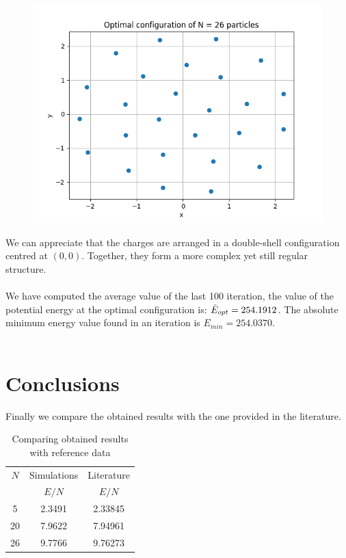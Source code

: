 \documentclass{article}
\begin{document}
\begin{figure}[H]
    \centering
    \includegraphics[width=\linewidth]{images/Figure2.N26.png}
    \caption{}
    \label{fig:Figure2.N26.png}
\end{figure}
\noindent We can  appreciate that the charges are arranged in a double-shell configuration centred at $(0,0)$. Together, they form a more complex yet still regular structure.\\\\We have computed the average value of the last 100 iteration, the value of the potential energy at the optimal configuration is: $\Tilde{E}_{opt}=254.1912$. The absolute minimum energy value found in an iteration is $E_{min}=254.0370$.\\\\
\section{Conclusions}
Finally we compare the obtained results with the one provided in the literature.
\begin{table}[H]
    \centering
    \begin{tabular}{|c|c|c|}
        \hline
        $N$& Simulations & Literature \\
        &$E/N$ & $E/N$ \\\hline\hline
        5 & 2.3491 & 2.33845 \\\hline
        20 & 7.9622 & 7.94961 \\\hline
        26 & 9.7766 & 9.76273 \\\hline
    \end{tabular}
    \caption{Comparing obtained results with reference data}
    \label{tab:1}
\end{table}
\end{document}
